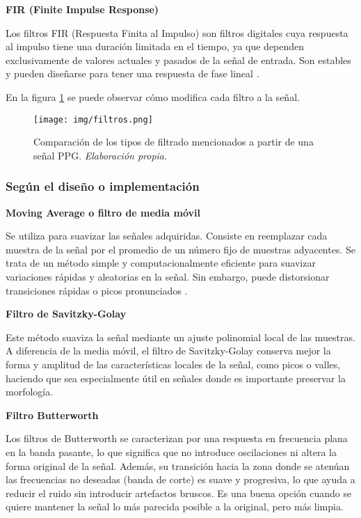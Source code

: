 \textbf{FIR (Finite Impulse Response)}

Los filtros FIR (Respuesta Finita al Impulso) son filtros digitales cuya respuesta al impulso tiene una duración limitada en el tiempo, ya que dependen exclusivamente de valores actuales y pasados de la señal de entrada. Son estables y pueden diseñarse para tener una respuesta de fase lineal \cite{gonzalez2014filtrado}.

En la figura \ref{fig:filtros} se puede observar cómo modifica cada filtro a la señal.

\begin{figure}[H]
    \centering
    \texttt{[image: img/filtros.png]}
    \caption{Comparación de los tipos de filtrado mencionados a partir de una señal PPG. \textit{Elaboración propia}.}
    \label{fig:filtros}
\end{figure}

\subsubsection{Según el diseño o implementación}

\textbf{Moving Average o filtro de media móvil}

Se utiliza para suavizar las señales adquiridas. Consiste en reemplazar cada muestra de la señal por el promedio de un número fijo de muestras adyacentes. Se trata de un método simple y computacionalmente eficiente para suavizar variaciones rápidas y aleatorias en la señal. Sin embargo, puede distorsionar transiciones rápidas o picos pronunciados \cite{mathworks_lowpass_filter}.

\textbf{Filtro de Savitzky-Golay}

Este método suaviza la señal mediante un ajuste polinomial local de las muestras. A diferencia de la media móvil, el filtro de Savitzky-Golay conserva mejor la forma y amplitud de las características locales de la señal, como picos o valles, haciendo que sea especialmente útil en señales donde es importante preservar la morfología.

\textbf{Filtro Butterworth}

Los filtros de Butterworth se caracterizan por una respuesta en frecuencia plana en la banda pasante, lo que significa que no introduce oscilaciones ni altera la forma original de la señal. Además, su transición hacia la zona donde se atenúan las frecuencias no deseadas (banda de corte) es suave y progresiva, lo que ayuda a reducir el ruido sin introducir artefactos bruscos. Es una buena opción cuando se quiere mantener la señal lo más parecida posible a la original, pero más limpia.

